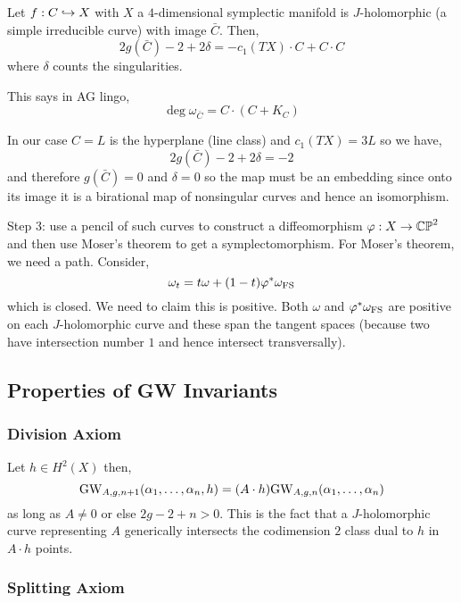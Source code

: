 \documentclass[12pt]{article}
\begin{document}
\begin{prop}[Adjunction]
Let $f : C \hookrightarrow X$ with $X$ a $4$-dimensional symplectic manifold is $J$-holomorphic (a simple irreducible curve) with image $\bar{C}$. Then,
\[ 2 g(\bar{C}) - 2 + 2 \delta = - c_1(TX) \cdot C + C \cdot C \] 
where $\delta$ counts the singularities. 
\end{prop}

\begin{rmk}
This says in AG lingo,
\[ \deg{\omega_{\bar{C}}} = C \cdot (C + K_C) \]
\end{rmk}

\begin{rmk}
In our case $C = L$ is the hyperplane (line class) and $c_1(TX) = 3 L$ so we have,
\[ 2 g(\bar{C}) - 2 + 2 \delta = -2 \]
and therefore $g(\bar{C}) = 0$ and $\delta = 0$ so the map must be an embedding since onto its image it is a birational map of nonsingular curves and hence an isomorphism. 
\end{rmk}

Step 3: use a pencil of such curves to construct a diffeomorphism $\varphi : X \to \mathbb{CP}^2$ and then use Moser's theorem to get a symplectomorphism. For Moser's theorem, we need a path. Consider,
\[ \omega_t = t \omega + (1 - t) \varphi^* \omega_{\text{FS}} \]
which is closed. We need to claim this is positive. Both $\omega$ and $\varphi^* \omega_{\text{FS}}$ are positive on each $J$-holomorphic curve and these span the tangent spaces (because two have intersection number $1$ and hence intersect transversally). 

\subsection{Properties of GW Invariants}


\subsubsection{Division Axiom}

Let $h \in H^2(X)$ then,
\[ \mathrm{GW}_{A,g,n+1}(\alpha_1, \dots, \alpha_n, h) = (A \cdot h) \mathrm{GW}_{A,g,n}(\alpha_1, \dots, \alpha_n) \]
as long as $A \neq 0$ or else $2 g - 2 + n > 0$. This is the fact that a $J$-holomorphic curve representing $A$ generically intersects the codimension $2$ class dual to $h$ in $A \cdot h$ points. 

\subsubsection{Splitting Axiom}
\end{document}
